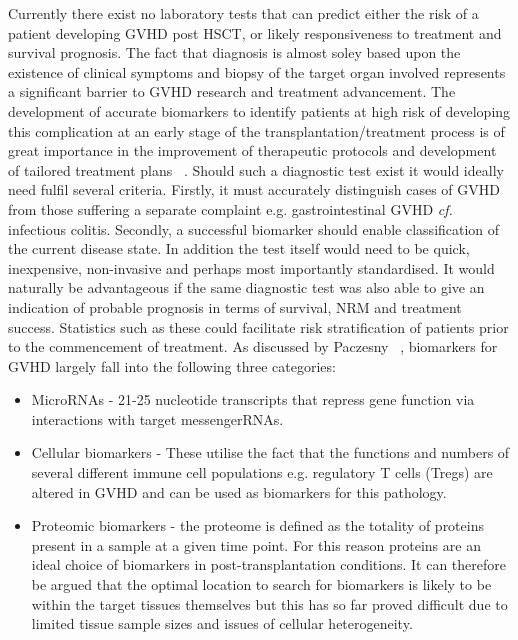Currently there exist no laboratory tests that can predict either the risk of a patient developing GVHD post HSCT, or likely responsiveness to treatment and survival prognosis. The fact that diagnosis is almost soley based upon the existence of clinical symptoms and biopsy of the target organ involved represents a significant barrier to GVHD research and treatment advancement. The development of accurate biomarkers to identify patients at high risk of developing this complication at an early stage of the transplantation/treatment process is of great importance in the improvement of therapeutic protocols and development of tailored treatment plans ~\autocite{Pac2013}. Should such a diagnostic test exist it would ideally need fulfil several criteria. Firstly, it must accurately distinguish cases of GVHD from those suffering a separate complaint e.g. gastrointestinal GVHD \textit{cf.} infectious colitis. Secondly, a successful biomarker should enable classification of the current disease state. In addition the test itself would need to be quick, inexpensive,  non-invasive and perhaps most importantly standardised. It would naturally be advantageous if the same diagnostic test was also able to give an indication of probable prognosis in terms of survival, NRM and treatment success. Statistics such as these could facilitate risk stratification of patients prior to the commencement of treatment. As discussed by Paczesny ~\autocite{Pac2013}, biomarkers for GVHD largely fall into the following three categories: 
\begin{itemize}
    \item MicroRNAs - 21-25 nucleotide transcripts that repress gene function via interactions with target messengerRNAs.
    \item Cellular biomarkers - These utilise the fact that the functions and numbers of several different immune cell populations e.g. regulatory T cells (Tregs) are altered in GVHD and can be used as biomarkers for this pathology. 
    \item Proteomic biomarkers - the proteome is defined as the totality of proteins present in a sample at a given time point. For this reason proteins are an ideal choice of biomarkers in post-transplantation conditions. It can therefore be argued that the optimal location to search for biomarkers is likely to be within the target tissues themselves but this has so far proved difficult due to limited tissue sample sizes and issues of cellular heterogeneity. 
\end{itemize}

